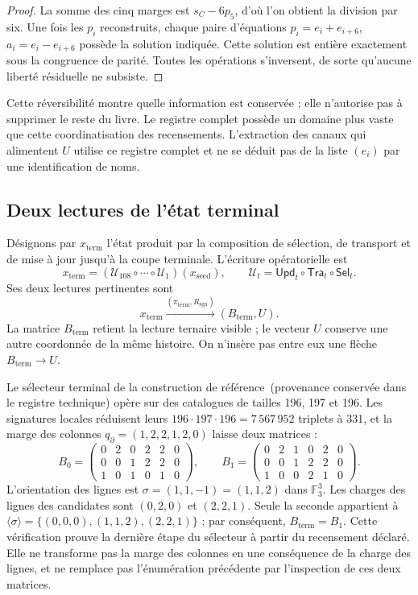\begin{proof}
La somme des cinq marges est \(s_C-6p_5\), d'où l'on obtient la
division par six. Une fois les \(p_i\) reconstruits, chaque paire d'équations
\(p_i=e_i+e_{i+6}\), \(a_i=e_i-e_{i+6}\) possède la solution indiquée.
Cette solution est entière exactement sous la congruence de parité. Toutes
les opérations s'inversent, de sorte qu'aucune liberté résiduelle ne subsiste.
\end{proof}

Cette réversibilité montre quelle information est conservée ; elle n'autorise pas à
supprimer le reste du livre. Le registre complet possède un domaine plus vaste
que cette coordinatisation des recensements. L'extraction des canaux qui alimentent
\(U\) utilise ce registre complet et ne se déduit pas de la liste
\((e_i)\) par une identification de noms.

\subsection{Deux lectures de l'état terminal}
\label{subsec:k-terminal}

Désignons par \(x_{\mathrm{term}}\) l'état produit par la composition de sélection, de transport et de mise à jour jusqu'à la coupe terminale. L'écriture opératorielle est
\[
 x_{\mathrm{term}}=
 (\mathcal U_{108}\circ\cdots\circ\mathcal U_1)(x_{\mathrm{seed}}),
 \qquad \mathcal U_t=\mathsf{Upd}_t\circ\mathsf{Tra}_t\circ\mathsf{Sel}_t.
\]
Ses deux lectures pertinentes sont
\[
 x_{\mathrm{term}}
 \xrightarrow{(\pi_{\mathrm{term}},R_{\mathrm{sgn}})}
 (B_{\mathrm{term}},U).
\]
La matrice \(B_{\mathrm{term}}\) retient la lecture ternaire visible ; le vecteur \(U\) conserve une autre coordonnée de la même histoire. On n'insère pas entre eux une flèche \(B_{\mathrm{term}}\to U\).

Le sélecteur terminal de la construction de référence~\textup{(provenance conservée dans le registre technique)} opère sur des catalogues de tailles 196, 197 et 196. Les signatures locales réduisent leurs \(196\cdot197\cdot196=7\,567\,952\) triplets à 331, et la marge des colonnes \(q_{\partial}=(1,2,2,1,2,0)\) laisse deux matrices :
\[
 B_0=\begin{pmatrix}0&2&0&2&2&0\\0&0&1&2&2&0\\1&0&1&0&1&0\end{pmatrix},
 \qquad
 B_1=\begin{pmatrix}0&2&1&0&2&0\\0&0&1&2&2&0\\1&0&0&2&1&0\end{pmatrix}.
\]
L'orientation des lignes est \(\sigma=(1,1,-1)=(1,1,2)\) dans
\(\mathbb F_3^3\). Les charges des lignes des candidates sont
\((0,2,0)\) et \((2,2,1)\). Seule la seconde appartient à
\(\langle\sigma\rangle=\{(0,0,0),(1,1,2),(2,2,1)\}\) ; par conséquent,
\(B_{\mathrm{term}}=B_1\). Cette vérification prouve la dernière étape du
sélecteur à partir du recensement déclaré. Elle ne transforme pas la marge des colonnes
en une conséquence de la charge des lignes, et ne remplace pas l'énumération
précédente par l'inspection de ces deux matrices.

